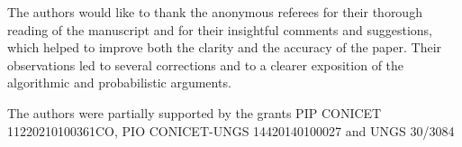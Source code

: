 \documentclass[pdflatex,sn-basic]{sn-jnl}%
\theoremstyle{thmstyleone}%
\theoremstyle{thmstyletwo}%
\theoremstyle{thmstylethree}%
\theoremstyle{definition}
\numberwithin{equation}{section}
\begin{document}

The authors would like to thank the anonymous referees for their thorough reading of the manuscript and for their insightful comments and suggestions, which helped to improve both the clarity and the accuracy of the paper. Their observations led to several corrections and to a clearer exposition of the algorithmic and probabilistic arguments.

The authors were partially supported by the grants
PIP CONICET 11220210100361CO, PIO CONICET-UNGS 14420140100027 and UNGS
30/3084

%



\end{document}
